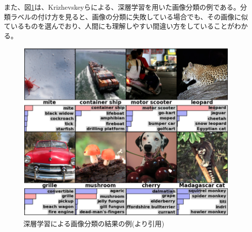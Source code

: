 また、図\ref{c3_krizhevsky}は、Krizhevskeyらによる、深層学習を用いた画像分類の例である\cite{krizhevsky2012imagenet}。分類ラベルの付け方を見ると、画像の分類に失敗している場合でも、その画像に似ているものを選んでおり、人間にも理解しやすい間違い方をしていることがわかる。\begin{figure}[tbp]
 \begin{center}
  \includegraphics[width=120mm]{img/c3/krizhevsky}
 \end{center}
 \caption{深層学習による画像分類の結果の例(\cite{krizhevsky2012imagenet}より引用)}
 \label{c3_krizhevsky}
\end{figure}

